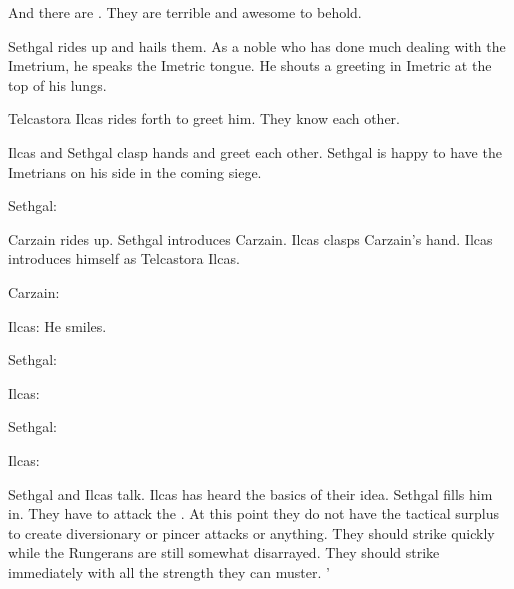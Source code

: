And there are \nycans. 
They are terrible and awesome to behold. 

Sethgal rides up and hails them. 
As a noble who has done much dealing with the Imetrium, he speaks the Imetric tongue. 
He shouts a greeting in Imetric at the top of his lungs. 

Telcastora Ilcas rides forth to greet him.
They know each other.

Ilcas and Sethgal clasp hands and greet each other.
Sethgal is happy to have the Imetrians on his side in the coming siege.

\begin{prose}
  Sethgal: 
  
\end{prose}

Carzain rides up. 
Sethgal introduces Carzain. 
Ilcas clasps Carzain's hand. 
Ilcas introduces himself as \Retaxis Telcastora Ilcas. 

\begin{prose}
  Carzain: 
  
  Ilcas: 
  He smiles. 

  Sethgal:

  Ilcas:

  Sethgal:
  
  Ilcas:
\end{prose}

Sethgal and Ilcas talk. 
Ilcas has heard the basics of their idea.
Sethgal fills him in.
They have to attack the \ishrah. 
At this point they do not have the tactical surplus to create diversionary \manoeuvres or pincer attacks or anything. 
They should strike quickly while the Rungerans are still somewhat disarrayed. 
They should strike immediately with all the strength they can muster. '


